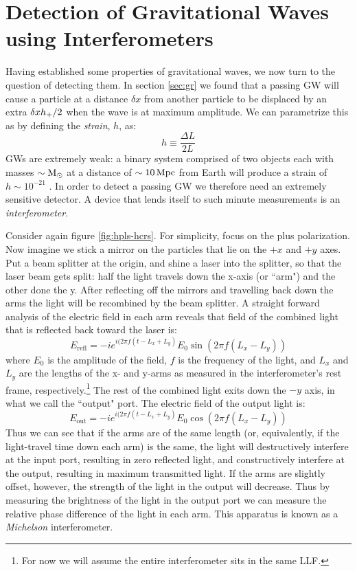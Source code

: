 \section{Detection of Gravitational Waves using Interferometers}
\label{sec:interferometry}

Having established some properties of gravitational waves, we now turn to the question of detecting them. In section \ref{sec:gr} we found that a passing \ac{GW} will cause a particle at a distance $\delta x$ from another particle to be displaced by an extra $\delta xh_{+}/2$ when the wave is at maximum amplitude. We can parametrize this as by defining the \emph{strain}, $h$, as:
\begin{equation}
h \equiv \frac{\Delta L}{2L}
\end{equation}
\acp{GW} are extremely weak: a binary system comprised of two objects each with masses $\sim \mathrm{M_\odot}$ at a distance of $\sim10\,\mathrm{Mpc}$ from Earth will produce a strain of $h \sim 10^{-21}$ \cite{Saulson}. In order to detect a passing \ac{GW} we therefore need an extremely sensitive detector. A device that lends itself to such minute measurements is an \emph{interferometer}.

Consider again figure \ref{fig:hpls-hcrs}. For simplicity, focus on the plus polarization. Now imagine we stick a mirror on the particles that lie on the $+x$ and $+y$ axes. Put a beam splitter at the origin, and shine a laser into the splitter, so that the laser beam gets split: half the light travels down the x-axis (or ``arm") and the other done the y. After reflecting off the mirrors and travelling back down the arms the light will be recombined by the beam splitter. A straight forward analysis of the electric field in each arm \cite{Saulson} reveals that field of the combined light that is reflected back toward the laser is:
\begin{equation}
E_{\mathrm{refl}} = -i e^{i(2\pi f( t - L_x + L_y )}E_0\sin(2\pi f(L_x - L_y))
\end{equation}
where $E_0$ is the amplitude of the field, $f$ is the frequency of the light, and $L_x$ and $L_y$ are the lengths of the x- and y-arms as measured in the interferometer's rest frame, respectively.\footnote{For now we will assume the entire interferometer sits in the same \ac{LLF}.} The rest of the combined light exits down the $-y$ axis, in what we call the ``output" port. The electric field of the output light is:
\begin{equation}
E_{\mathrm{out}} = -i e^{i(2\pi f( t - L_x + L_y )}E_0\cos(2\pi f(L_x - L_y))
\end{equation}
Thus we can see that if the arms are of the same length (or, equivalently, if the light-travel time down each arm) is the same, the light will destructively interfere at the input port, resulting in zero reflected light, and constructively interfere at the output, resulting in maximum transmitted light. If the arms are slightly offset, however, the strength of the light in the output will decrease. Thus by measuring the brightness of the light in the output port we can measure the relative phase difference of the light in each arm. This apparatus is known as a \emph{Michelson} interferometer.

